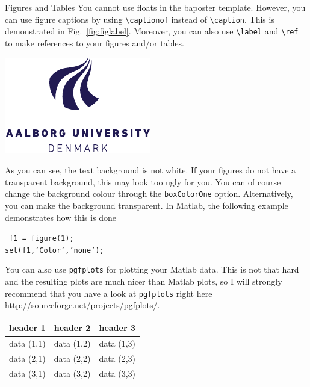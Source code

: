 \documentclass[a0paper,portrait]{baposter}
\begin{document}
\begin{poster}
\begin{posterbox}[name=figures,column=1,below=install,above=bottom]{Figures and Tables}
You cannot use floats in the baposter template. However, you can use figure captions by using {\tt \textbackslash captionof} instead of {\tt \textbackslash caption}. This is demonstrated in Fig.~\ref{fig:figlabel}. Moreover, you can also use {\tt \textbackslash label} and {\tt \textbackslash ref} to make references to your figures and/or tables.
\begin{center}
  \includegraphics{AAUgraphics/aau_logo_new}
  \label{fig:figlabel}
\end{center}
As you can see, the text background is not white. If your figures do not have a transparent background, this may look too ugly for you. You can of course change the background colour through the {\tt boxColorOne} option. Alternatively, you can make the background transparent. In Matlab, the following example demonstrates how this is done\par
{\tt
f1 = figure(1);\\
set(f1,'Color','none');
}\par
You can also use {\tt pgfplots} \cite{pgfplots} for plotting your Matlab data. This is not that hard and the resulting plots are much nicer than Matlab plots, so I will strongly recommend that you have a look at {\tt pgfplots} right here \url{http://sourceforge.net/projects/pgfplots/}.
\begin{center}
  \begin{tabular}{c c c}
    \toprule
    header 1 & header 2 & header 3\\
    \midrule
    data (1,1) & data (1,2) & data (1,3)\\
    data (2,1) & data (2,2) & data (2,3)\\
    data (3,1) & data (3,2) & data (3,3)\\
    \bottomrule
  \end{tabular}
  \label{tab:tablabel}
\end{center}
\end{posterbox}


\end{poster}
\end{document}
